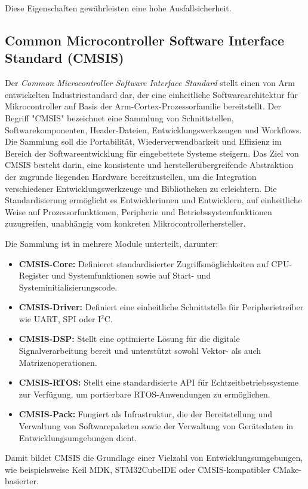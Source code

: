  Diese Eigenschaften gewährleisten eine hohe Ausfallsicherheit.

\subsection*{Common Microcontroller Software Interface Standard (CMSIS)}
Der \emph{Common Microcontroller Software Interface Standard} stellt einen von Arm entwickelten Industriestandard dar, der eine einheitliche Softwarearchitektur für Mikrocontroller auf Basis der Arm-Cortex-Prozessorfamilie bereitstellt.
Der Begriff "CMSIS"  bezeichnet eine Sammlung von Schnittstellen, Softwarekomponenten, Header-Dateien, Entwicklungswerkzeugen und Workflows.
 Die Sammlung soll die Portabilität, Wiederverwendbarkeit und Effizienz im Bereich der Softwareentwicklung für eingebettete Systeme steigern.
Das Ziel von CMSIS besteht darin, eine konsistente und herstellerübergreifende Abstraktion der zugrunde liegenden Hardware bereitzustellen, um die Integration verschiedener Entwicklungswerkzeuge und Bibliotheken zu erleichtern.
Die Standardisierung ermöglicht es Entwicklerinnen und Entwicklern, auf einheitliche Weise auf Prozessorfunktionen, Peripherie und Betriebssystemfunktionen zuzugreifen, unabhängig vom konkreten Mikrocontrollerhersteller.

Die Sammlung ist in mehrere Module unterteilt, darunter:
\begin{itemize}
	\item \textbf{CMSIS-Core:} Definieret standardisierter Zugriffsmöglichkeiten auf CPU-Register und Systemfunktionen sowie auf Start- und Systeminitialisierungscode.
	\item \textbf{CMSIS-Driver:} Definiert eine einheitliche Schnittstelle für Peripherietreiber wie UART, SPI oder I$^2$C.
	\item \textbf{CMSIS-DSP:} Stellt eine optimierte Lösung für die digitale Signalverarbeitung bereit und unterstützt sowohl Vektor- als auch Matrizenoperationen.
	\item \textbf{CMSIS-RTOS:} Stellt eine standardisierte API für Echtzeitbetriebssysteme zur Verfügung, um portierbare RTOS-Anwendungen zu ermöglichen.
	\item \textbf{CMSIS-Pack:} Fungiert als Infrastruktur, die der Bereitstellung und Verwaltung von Softwarepaketen sowie der Verwaltung von Gerätedaten in Entwicklungsumgebungen dient.
\end{itemize}

Damit bildet CMSIS die Grundlage einer Vielzahl von Entwicklungsumgebungen, wie beispielsweise Keil MDK, STM32CubeIDE oder CMSIS-kompatibler CMake-basierter.



